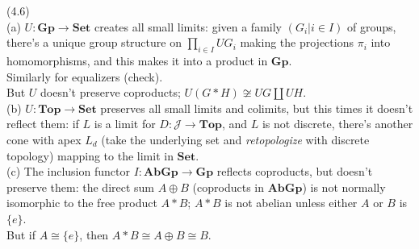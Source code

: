 \documentclass[a4paper]{article}
\begin{document}
\begin{eg} (4.6)\\
    (a) $U : \mathbf{Gp} \to \mathbf{Set}$ creates all small limits: given a family $(G_i | i \in I)$ of groups, there's a unique group structure on $\prod_{i \in I} UG_i$ making the projections $\pi_i$ into homomorphisms, and this makes it into a product in $\mathbf{Gp}$.\\
    Similarly for equalizers (check).\\
    But $U$ doesn't preserve coproducts; $U(G * H) \not\cong UG \coprod UH$.\\
    (b) $U:\mathbf{Top} \to \mathbf{Set}$ preserves all small limits and colimits, but this times it doesn't reflect them: if $L$ is a limit for $D: \mathcal{J} \to \mathbf{Top}$, and $L$ is not discrete, there's another cone with apex $L_d$ (take the underlying set and \emph{retopologize} with discrete topology) mapping to the limit in $\mathbf{Set}$.\\
    (c) The inclusion functor $I:\mathbf{AbGp} \to \mathbf{Gp}$ reflects coproducts, but doesn't preserve them: the direct sum $A \oplus B$ (coproducts in $\mathbf{AbGp}$) is not normally isomorphic to the free product $A*B$; $A*B$ is not abelian unless either $A$ or $B$ is $\{e\}$.\\
    But if $A \cong \{e\}$, then $A*B \cong A \oplus B \cong B$.
\end{eg}
\end{document}
